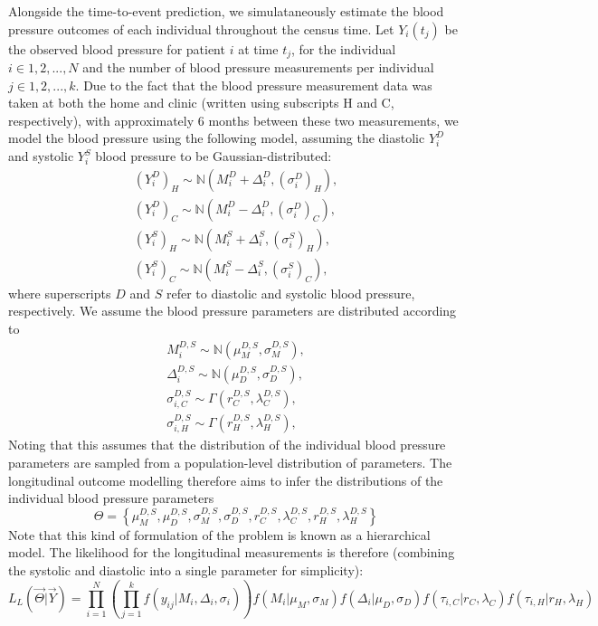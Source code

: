 \documentclass[
]{article}
\begin{document}
Alongside the time-to-event prediction, we simulataneously estimate the
blood pressure outcomes of each individual throughout the census time.
Let \(Y_i(t_j)\) be the observed blood pressure for patient \(i\) at
time \(t_j\), for the individual \(i\in 1,2,...,N\) and the number of
blood pressure measurements per individual \(j\in 1,2,...,k\). Due to
the fact that the blood pressure measurement data was taken at both the
home and clinic (written using subscripts H and C, respectively), with
approximately 6 months between these two measurements, we model the
blood pressure using the following model, assuming the diastolic
\(Y_{i}^D\) and systolic \(Y_{i}^S\) blood pressure to be
Gaussian-distributed: \begin{equation}\label{bp}
\begin{aligned}
  (Y_{i}^D)_{H} \sim \mathbb{N}(M_i^D+\Delta_i^D,(\sigma_i^D)_H),\\
  (Y_{i}^D)_{C} \sim \mathbb{N}(M_i^D-\Delta_i^D,(\sigma_i^D)_C),\\
  (Y_{i}^S)_{H} \sim \mathbb{N}(M_i^S+\Delta_i^S,(\sigma_i^S)_H),\\
  (Y_{i}^S)_{C} \sim \mathbb{N}(M_i^S-\Delta_i^S,(\sigma_i^S)_C),
\end{aligned}
\end{equation} where superscripts \(D\) and \(S\) refer to diastolic and
systolic blood pressure, respectively. We assume the blood pressure
parameters are distributed according to \begin{equation}\label{priorsL}
\begin{aligned}
  M_i^{D,S}\sim \mathbb{N}(\mu_M^{D,S},\sigma_M^{D,S}),\\
  \Delta_i^{D,S}\sim \mathbb{N}(\mu_D^{D,S},\sigma_D^{D,S}),\\
  \sigma_{i,C}^{D,S}\sim \Gamma(r_C^{D,S},\lambda_C^{D,S}),\\
  \sigma_{i,H}^{D,S}\sim \Gamma(r_H^{D,S},\lambda_H^{D,S}),
\end{aligned}
\end{equation} Noting that this assumes that the distribution of the
individual blood pressure parameters are sampled from a population-level
distribution of parameters. The longitudinal outcome modelling therefore
aims to infer the distributions of the individual blood pressure
parameters \begin{equation}
  \Theta=\left\{\mu_M^{D,S},\mu_D^{D,S},\sigma_M^{D,S},\sigma_D^{D,S},r_C^{D,S},\lambda_C^{D,S},r_H^{D,S},\lambda_H^{D,S}\right\}
\end{equation} Note that this kind of formulation of the problem is
known as a hierarchical model. The likelihood for the longitudinal
measurements is therefore (combining the systolic and diastolic into a
single parameter for simplicity): \begin{equation}\label{likelong}
  L_L(\vec{\Theta}|\vec{Y})=\prod_{i=1}^N\left(\prod_{j=1}^{k}f(y_{ij}|M_i,\Delta_i,\sigma_i)\right)f(M_i|\mu_M,\sigma_M)f(\Delta_i|\mu_D,\sigma_D)f(\tau_{i,C}|r_C,\lambda_C)f(\tau_{i,H}|r_H,\lambda_H)
\end{equation}
\end{document}
